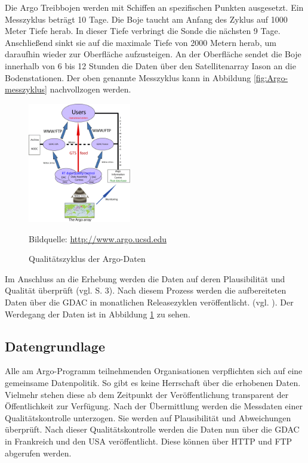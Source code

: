     Die Argo Treibbojen werden mit Schiffen an spezifischen Punkten ausgesetzt. Ein Messzyklus beträgt 10 Tage. Die Boje taucht am Anfang des Zyklus auf 1000 Meter Tiefe herab.  In dieser Tiefe verbringt die Sonde die nächsten 9 Tage. Anschließend sinkt sie auf die maximale Tiefe von 2000 Metern herab, um daraufhin wieder zur Oberfläche aufzusteigen. An der Oberfläche sendet die Boje innerhalb von 6 bis 12 Stunden die Daten über den Satellitenarray Iason an die Bodenstationen. Der oben genannte Messzyklus kann in Abbildung \ref{fig:Argo-messzyklus} nachvollzogen werden.

    \begin{figure}[!ht]
        \centering
        \includegraphics[width=0.4\textwidth]{pix/RT-Data-flow}
        \caption[Qualitätszyklus der Argo-Daten]{Qualitätszyklus der Argo-Daten}
        \footnotesize{
            Bildquelle: \href{http://www.argo.ucsd.edu/Argo_data_and.html}%
                        {\url{http://www.argo.ucsd.edu}}
        }


        \label{fig:argo_dataflow}
    \end{figure}

    Im Anschluss an die Erhebung werden die Daten auf deren Plausibilität und Qualität überprüft (vgl. \cite{ArgoDataBeginnersGuide} S. 3). Nach diesem Prozess werden die aufbereiteten Daten über die \gls{GDAC} in monatlichen Releasezyklen veröffentlicht. (vgl. \cite{Argofloa92:online}). Der Werdegang der Daten ist in Abbildung \ref{fig:argo_dataflow} zu sehen.

\subsection{Datengrundlage}


    Alle am Argo-Programm teilnehmenden Organisationen verpflichten sich auf eine gemeinsame Datenpolitik. So gibt es keine Herrschaft über die erhobenen Daten. Vielmehr stehen diese ab dem Zeitpunkt der Veröffentlichung transparent der Öffentlichkeit zur Verfügung.
    Nach der Übermittlung werden die Messdaten einer Qualitätskontrolle unterzogen. Sie werden auf Plausibilität und Abweichungen überprüft. Nach dieser Qualitätskontrolle werden die Daten nun über die \gls{GDAC} in Frankreich und den USA veröffentlicht. Diese können über \gls{HTTP} und \gls{FTP} abgerufen werden.

